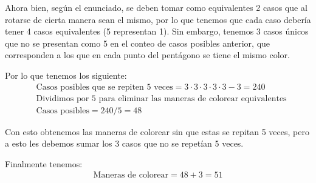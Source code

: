 \documentclass[spanish, fleqn]{article}
\begin{document}
	Ahora bien, según el enunciado, se deben tomar como equivalentes 2 casos que al rotarse de cierta manera sean el mismo, por lo que tenemos que cada caso debería tener 4 casos equivalentes (5 representan 1). Sin embargo, tenemos 3 casos únicos que no se presentan como 5 en el conteo de casos posibles anterior, que corresponden a los que en cada punto del pentágono se tiene el mismo color.
	
	Por lo que tenemos los siguiente:	
	\begin{align*}
	&\text{Casos posibles que se repiten 5 veces}=3\cdot 3\cdot 3\cdot 3\cdot 3-3=240\\
	&\text{Dividimos por 5 para eliminar las maneras de colorear equivalentes}\\
	&\text{Casos posibles}=240/5=48
	\end{align*}
	
	Con esto obtenemos las maneras de colorear sin que estas se repitan 5 veces, pero a esto les debemos sumar los 3 casos que no se repetían 5 veces.
	
	Finalmente tenemos:
	\begin{align*}
	\text{Maneras de colorear}=48+3=51
	\end{align*}		
	
\end{document}
